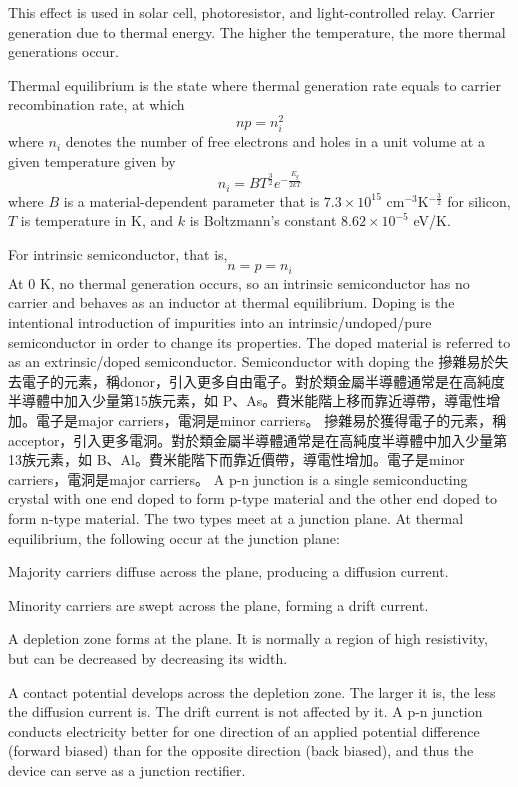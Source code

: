 \documentclass[a4paper,12pt]{article}
\begin{document}
This effect is used in solar cell, photoresistor, and light-controlled relay.
Carrier generation due to thermal energy. The higher the temperature, the more thermal generations occur.

Thermal equilibrium is the state where thermal generation rate equals to carrier recombination rate, at which
\[np=n_i^2\]
where $n_i$ denotes the number of free electrons and holes in a unit volume at a given temperature given by
\[n_i=BT^{\frac{3}{2}}e^{-\frac{E_g}{2kT}}\]
where $B$ is a material-dependent parameter that is $7.3\times 10^{15}$ cm$^{-3}$K$^{-\frac{3}{2}}$ for silicon, $T$ is temperature in K, and $k$ is Boltzmann's constant $8.62\times 10^{-5}$ eV/K.

For intrinsic semiconductor, that is,
\[n=p=n_i\]
At 0 K, no thermal generation occurs, so an intrinsic semiconductor has no carrier and behaves as an inductor at thermal equilibrium.
Doping is the intentional introduction of impurities into an intrinsic/undoped/pure semiconductor in order to change its properties. The doped material is referred to as an extrinsic/doped semiconductor.
Semiconductor with doping the 
摻雜易於失去電子的元素，稱donor，引入更多自由電子。對於類金屬半導體通常是在高純度半導體中加入少量第15族元素，如 P、As。費米能階上移而靠近導帶，導電性增加。電子是major carriers，電洞是minor carriers。
摻雜易於獲得電子的元素，稱acceptor，引入更多電洞。對於類金屬半導體通常是在高純度半導體中加入少量第13族元素，如 B、Al。費米能階下而靠近價帶，導電性增加。電子是minor carriers，電洞是major carriers。
A p-n junction is a single semiconducting crystal with one end doped to form p-type material and the other end doped to form n-type material. The two types meet at a junction plane. At thermal equilibrium, the following occur at the junction plane:
\bit
\item Majority carriers diffuse across the plane, producing a diffusion current.
\item Minority carriers are swept across the plane, forming a drift current.
\item A depletion zone forms at the plane. It is normally a region of high resistivity, but can be decreased by decreasing its width.
\item A contact potential develops across the depletion zone. The larger it is, the less the diffusion current is. The drift current is not affected by it.
\eit
{}
A p-n junction conducts electricity better for one direction of an applied potential difference (forward biased) than for the opposite direction (back biased), and thus the device can serve as a junction rectifier.
\end{document}
